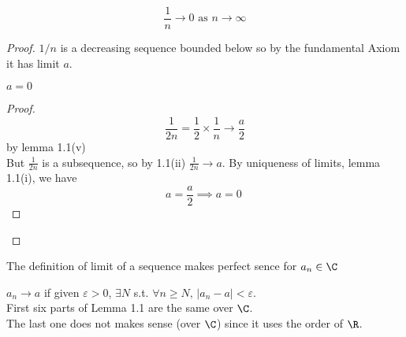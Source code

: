 \begin{lemma}
\[\frac{1}{n} \to 0 \text{ as } n \to \infty\]
\begin{proof}
$1/n$ is a decreasing sequence bounded below so by the fundamental Axiom it has limit $a$.
\begin{claim}
$a = 0$
\end{claim}
\begin{proof}
\[\frac{1}{2n} = \frac{1}{2} \times \frac{1}{n} \to \frac{a}{2}\]
by lemma 1.1(v)\\
But $\frac{1}{2n}$ is a subsequence, so by 1.1(ii) $\frac{1}{2n} \to a$. By uniqueness of limits, lemma 1.1(i), we have \[a = \frac{a}{2} \implies a = 0 \ \]
\end{proof}
\end{proof}
\end{lemma}
\begin{remark}
The definition of limit of a sequence makes perfect sence for $a_n \in \C$
\end{remark}
\begin{definition}
$a_n \to a$ if given $\varepsilon > 0$, $\exists N$ s.t. $\forall n \geq N,\, |a_n - a| < \varepsilon$.\\
First six parts of Lemma 1.1 are the same over $\C$.\\
The last one does not makes sense (over $\C$) since it uses the order of $\R$.
\end{definition}
